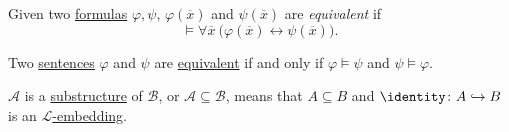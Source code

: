 \begin{definition}[Equivalent]\label{def:equivalent}
	Given two \hyperref[def:formula]{formulas} \(\varphi , \psi \), \(\varphi (\overline{x} )\) and \(\psi (\overline{x} )\) are \emph{equivalent} if
	\[
		\models \forall \overline{x} \ \big(\varphi (\overline{x} ) \leftrightarrow \psi (\overline{x} )\big).
	\]
\end{definition}

\begin{problem*}
	Two \hyperref[def:sentence]{sentences} \(\varphi \) and \(\psi \) are \hyperref[def:equivalent]{equivalent} if and only if \(\varphi \models \psi \) and \(\psi \models \varphi \).
\end{problem*}

\begin{prev}
	\(\mathcal{A} \) is a \hyperref[def:substructure]{substructure} of \(\mathcal{B} \), or \(\mathcal{A} \subseteq \mathcal{B} \), means that \(A \subseteq B\) and \(\identity\colon A \hookrightarrow B \) is an \hyperref[def:embedding]{\(\mathcal{L} \)-embedding}.
\end{prev}


